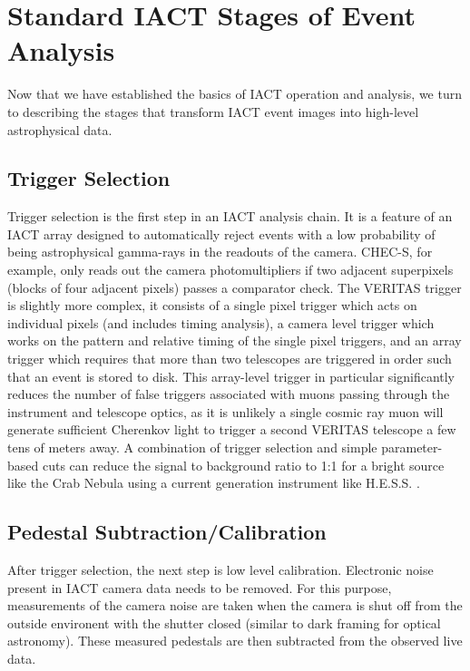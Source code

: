\section{Standard IACT Stages of Event Analysis}\label{app:imaging}
Now that we have established the basics of IACT operation and analysis, we turn to describing the stages that transform IACT event images into high-level astrophysical data.
\subsection{Trigger Selection}

Trigger selection is the first step in an IACT analysis chain. It is a feature of an IACT array designed to automatically reject events with a low probability of being astrophysical gamma-rays in the readouts of the camera. CHEC-S, for example, only reads out the camera photomultipliers if two adjacent superpixels (blocks of four adjacent pixels) passes a comparator check. The VERITAS trigger is slightly more complex, it consists of a single pixel trigger which acts on individual pixels (and includes timing analysis), a camera level trigger which works on the pattern and relative timing of the single pixel triggers, and an array trigger which requires that more than two telescopes are triggered in order such that an event is stored to disk\cite{veritastrigger}. This array-level trigger in particular significantly reduces the number of false triggers associated with muons passing through the instrument and telescope optics, as it is unlikely a single cosmic ray muon will generate sufficient Cherenkov light to trigger a second VERITAS telescope a few tens of meters away. A combination of trigger selection and simple parameter-based cuts can reduce the signal to background ratio to 1:1 for a bright source like the Crab Nebula using a current generation instrument like H.E.S.S. \cite{Berge07}.

\subsection{Pedestal Subtraction/Calibration}

After trigger selection, the next step is low level calibration. Electronic noise present in IACT camera data needs to be removed. For this purpose, measurements of the camera noise are taken when the camera is shut off from the outside environent with the shutter closed (similar to dark framing for optical astronomy). These measured pedestals are then subtracted from the observed live data.

